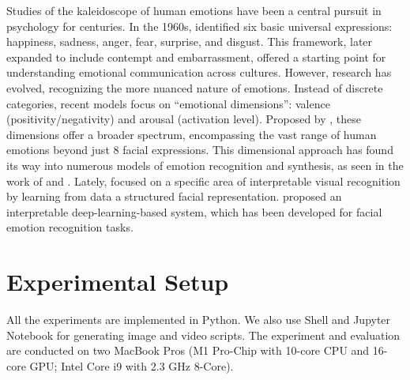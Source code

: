 Studies of the kaleidoscope of human emotions have been a central pursuit in psychology for centuries. 
In the 1960s, \citet{ekman1971constants} identified six basic universal expressions: 
happiness, sadness, anger, fear, surprise, and disgust. 
This framework, 
later expanded to include contempt and embarrassment, 
offered a starting point for understanding emotional communication across cultures.
However, research has evolved, recognizing the more nuanced nature of emotions. 
Instead of discrete categories, 
recent models focus on ``emotional dimensions'': valence (positivity/negativity) and arousal (activation level). 
Proposed by \citet{russell1980circumplex}, 
these dimensions offer a broader spectrum, 
encompassing the vast range of human emotions beyond just 8 facial expressions. 
This dimensional approach has found its way into numerous models of emotion recognition and synthesis, 
as seen in the work of \citet{KolliasTBCZ23} and \citet{tottenham2009nimstim}. 
Lately, 
\citet{YinTLS019} focused on a specific area of interpretable visual recognition by learning from data a structured facial representation. 
\citet{Malik0R21} proposed an interpretable deep-learning-based system, 
which has been developed for facial emotion recognition tasks. 


\section{Experimental Setup}
\label{sec:setup}

All the experiments are implemented in Python. 
We also use Shell and Jupyter Notebook for generating image and video scripts. 
The experiment and evaluation are conducted on two MacBook Pros 
(M1 Pro-Chip with 10-core CPU and 16-core GPU; Intel Core i9 with 2.3 GHz 8-Core). 

